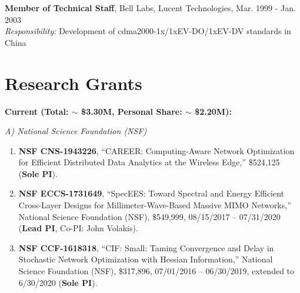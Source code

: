 \documentclass[overlapped,line,letterpaper]{res1}
\begin{document}
\begin{resume}

%

{\bf Member of Technical Staff}, {Bell Labs, Lucent Technologies, Mar. 1999 - Jan. 2003} \\
\medskip
{\em Responsibility:} Development of cdma2000-1x/1xEV-DO/1xEV-DV standards in China 
\vspace{-.1in}


\section{\bf \large Research Grants}
\vspace{.12in}
\hspace{-.55in} {\bf Current (Total: $\sim$ \$3.30M, Personal Share: $\sim$ \$2.20M):}

\hspace{-.55in} {\em A) National Science Foundation (NSF)}
\vspace*{.08in}

\begin{enumerate}
\vspace*{.08in} \item {\bf NSF CNS-1943226}, ``CAREER: Computing-Aware Network Optimization for Efficient Distributed Data Analytics at the Wireless Edge,'' \$524,125 ({\bf Sole PI}).

\vspace*{.08in} \item {\bf NSF ECCS-1731649}, ``SpecEES: Toward Spectral and Energy Efficient Cross-Layer Designs for Millimeter-Wave-Based Massive MIMO Networks,'' National Science Foundation (NSF), \$549,999, 08/15/2017 -- 07/31/2020 ({\bf Lead PI}, Co-PI: John Volakis).

\vspace*{.08in} \item {\bf NSF CCF-1618318}, ``CIF: Small: Taming Convergence and Delay in Stochastic Network Optimization with Hessian Information,'' National Science Foundation (NSF), \$317,896, 07/01/2016 -- 06/30/2019, extended to 6/30/2020 ({\bf Sole PI}).


\end{enumerate}
\end{resume}
\end{document}
